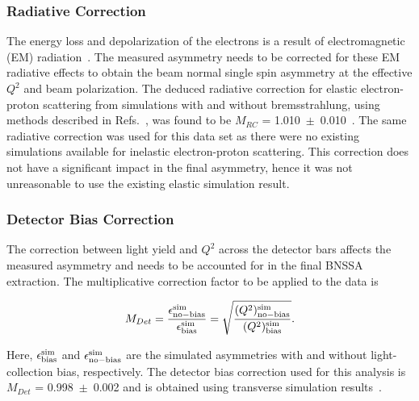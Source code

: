 \subsubsection{Radiative Correction}
\label{Radiative Correction}
The energy loss and depolarization of the electrons is a result of electromagnetic (EM) radiation~\cite{PhysRev.114.887}. The measured asymmetry needs to be corrected for these EM radiative effects to obtain the beam normal single spin asymmetry at the effective $Q^{2}$ and beam polarization. The deduced radiative correction for elastic electron-proton scattering from simulations with and without bremsstrahlung, using methods described in Refs.~\cite{PhysRevLett.82.1096, PhysRevC.69.065501}, was found to be $M_{RC}$ = 1.010~$\pm$~0.010~\cite{buddhini_qweak}. The same radiative correction was used for this data set as there were no existing simulations available for inelastic electron-proton scattering. This correction does not have a significant impact in the final asymmetry, hence it was not unreasonable to use the existing elastic simulation result. %


\subsubsection{Detector Bias Correction}
\label{Detector Bias Correction}

The correction between light yield and $Q^{2}$ across the detector bars affects the measured asymmetry and needs to be accounted for in the final BNSSA extraction. The multiplicative correction factor to be applied to the data is 

\begin{equation} \label{equ:eqQ2Acceptance1}
M_{Det} = \frac{\epsilon_{\rm no-bias}^{\rm sim}}{\epsilon_{\rm bias}^{{\rm sim}}} = \sqrt{\frac{(Q^{2})_{\rm no-bias}^{\rm sim}}{(Q^{2})_{\rm bias}^{\rm sim}} }.
\end{equation}

Here, $\epsilon^{\rm sim}_{\rm bias}$ and $\epsilon^{\rm sim}_{\rm no-bias}$ are the simulated asymmetries with and without light-collection bias, respectively.
The detector bias correction used for this analysis is $M_{Det}$ = 0.998~$\pm$~0.002 and is obtained using transverse simulation results~\cite{elog:peiqing_analysis589, buddhini_qweak}.

